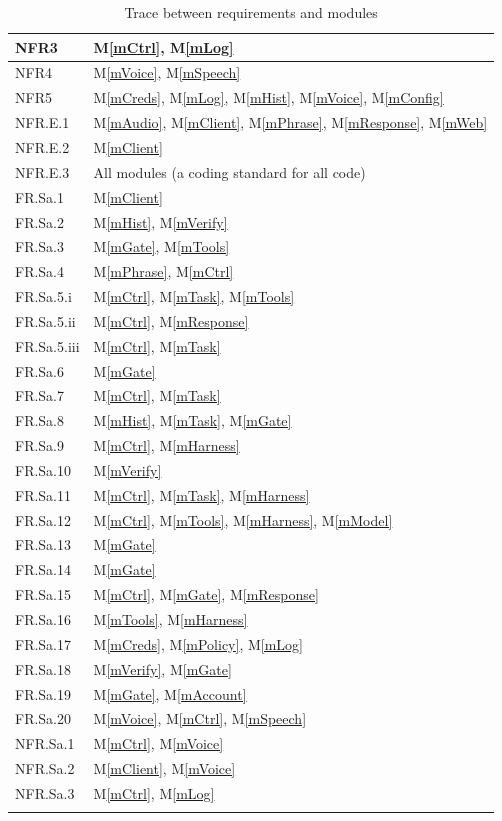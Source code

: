 \documentclass[12pt, titlepage]{article}
\newcommand{\mref}[1]{M\ref{#1}}
\begin{document}
\begin{longtable}{|l|l|}
\hline
NFR3 & \mref{mCtrl}, \mref{mLog}\\
\hline
NFR4 & \mref{mVoice}, \mref{mSpeech}\\
\hline
NFR5 & \mref{mCreds}, \mref{mLog}, \mref{mHist}, \mref{mVoice}, \mref{mConfig}\\
\hline
NFR.E.1 & \mref{mAudio}, \mref{mClient}, \mref{mPhrase}, \mref{mResponse}, \mref{mWeb}\\
\hline
NFR.E.2 & \mref{mClient}\\
\hline
NFR.E.3 & All modules (a coding standard for all code)\\
\hline
FR.Sa.1 & \mref{mClient}\\
\hline
FR.Sa.2 & \mref{mHist}, \mref{mVerify}\\
\hline
FR.Sa.3 & \mref{mGate}, \mref{mTools}\\
\hline
FR.Sa.4 & \mref{mPhrase}, \mref{mCtrl}\\
\hline
FR.Sa.5.i & \mref{mCtrl}, \mref{mTask}, \mref{mTools}\\
\hline
FR.Sa.5.ii & \mref{mCtrl}, \mref{mResponse}\\
\hline
FR.Sa.5.iii & \mref{mCtrl}, \mref{mTask}\\
\hline
FR.Sa.6 & \mref{mGate}\\
\hline
FR.Sa.7 & \mref{mCtrl}, \mref{mTask}\\
\hline
FR.Sa.8 & \mref{mHist}, \mref{mTask}, \mref{mGate}\\
\hline
FR.Sa.9 & \mref{mCtrl}, \mref{mHarness}\\
\hline
FR.Sa.10 & \mref{mVerify}\\
\hline
FR.Sa.11 & \mref{mCtrl}, \mref{mTask}, \mref{mHarness}\\
\hline
FR.Sa.12 & \mref{mCtrl}, \mref{mTools}, \mref{mHarness}, \mref{mModel}\\
\hline
FR.Sa.13 & \mref{mGate}\\
\hline
FR.Sa.14 & \mref{mGate}\\
\hline
FR.Sa.15 & \mref{mCtrl}, \mref{mGate}, \mref{mResponse}\\
\hline
FR.Sa.16 & \mref{mTools}, \mref{mHarness}\\
\hline
FR.Sa.17 & \mref{mCreds}, \mref{mPolicy}, \mref{mLog}\\
\hline
FR.Sa.18 & \mref{mVerify}, \mref{mGate}\\
\hline
FR.Sa.19 & \mref{mGate}, \mref{mAccount}\\
\hline
FR.Sa.20 & \mref{mVoice}, \mref{mCtrl}, \mref{mSpeech}\\
\hline
NFR.Sa.1 & \mref{mCtrl}, \mref{mVoice}\\
\hline
NFR.Sa.2 & \mref{mClient}, \mref{mVoice}\\
\hline
NFR.Sa.3 & \mref{mCtrl}, \mref{mLog}\\
\hline
\caption{Trace between requirements and modules}
\label{TblRT}
\end{longtable}
\end{document}
